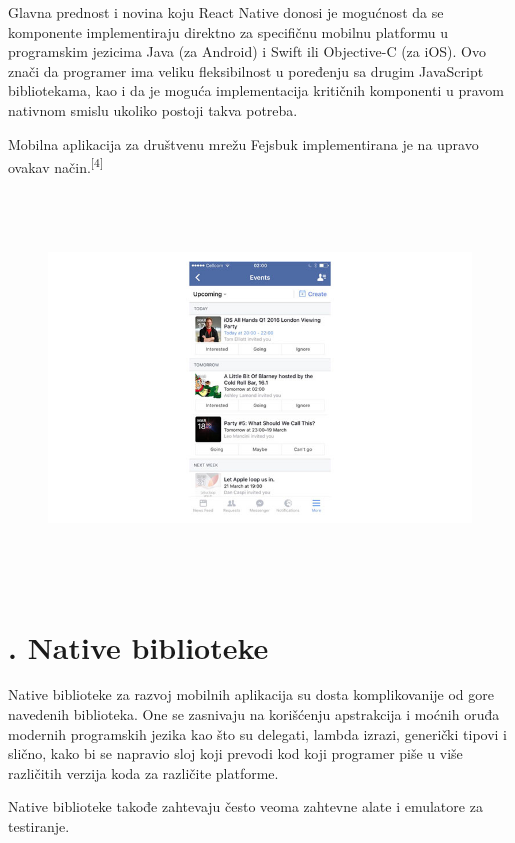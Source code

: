 \documentclass[a4paper]{article}
\begin{document}
Glavna prednost i novina koju React Native donosi je mogućnost da se
komponente implementiraju direktno za specifičnu mobilnu platformu u
programskim jezicima Java (za Android) i Swift ili Objective-C (za
iOS). Ovo znači da programer ima veliku fleksibilnost u poređenju sa
drugim JavaScript bibliotekama, kao i da je moguća implementacija
kritičnih komponenti u pravom nativnom smislu ukoliko postoji takva
potreba.

Mobilna aplikacija za društvenu mrežu Fejsbuk implementirana je na
upravo ovakav način.\textsuperscript{[4]}



\begin{figure}
\centering
\includegraphics[width=162.56mm,height=103.8mm]{msc-img7.png}
\end{figure}
\clearpage\section[3. Native biblioteke]{. Native biblioteke}
\hypertarget{RefHeadingToc1051308303690}{}Native biblioteke za razvoj
mobilnih aplikacija su dosta komplikovanije od gore navedenih
biblioteka. One se zasnivaju na korišćenju apstrakcija i moćnih oruđa
modernih programskih jezika kao što su delegati, lambda izrazi,
generički tipovi i slično, kako bi se napravio sloj koji prevodi kod
koji programer piše u više različitih verzija koda za različite
platforme. 

Native biblioteke takođe zahtevaju često veoma zahtevne alate i
emulatore za testiranje.
\end{document}
